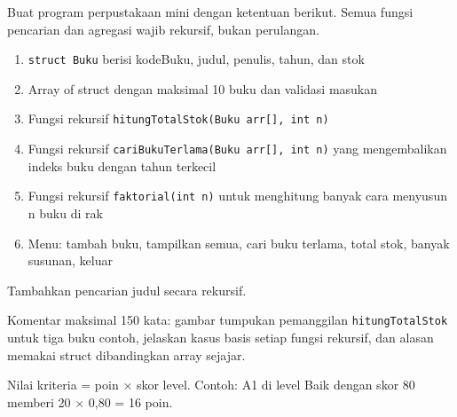 \documentclass[a4paper]{article}
\begin{document}
Buat program perpustakaan mini dengan ketentuan berikut. Semua fungsi pencarian dan agregasi wajib rekursif, bukan perulangan.
\begin{enumerate}
\item \texttt{struct Buku} berisi kodeBuku, judul, penulis, tahun, dan stok
\item Array of struct dengan maksimal 10 buku dan validasi masukan
\item Fungsi rekursif \texttt{hitungTotalStok(Buku arr[], int n)}
\item Fungsi rekursif \texttt{cariBukuTerlama(Buku arr[], int n)} yang mengembalikan indeks buku dengan tahun terkecil
\item Fungsi rekursif \texttt{faktorial(int n)} untuk menghitung banyak cara menyusun n buku di rak
\item Menu: tambah buku, tampilkan semua, cari buku terlama, total stok, banyak susunan, keluar
\end{enumerate}
\begin{Contoh}
Tambahkan pencarian judul secara rekursif.
\end{Contoh}
Komentar maksimal 150 kata: gambar tumpukan pemanggilan \texttt{hitungTotalStok} untuk tiga buku contoh, jelaskan kasus basis setiap fungsi rekursif, dan alasan memakai struct dibandingkan array sejajar.

\par\vspace{4pt}\par\vspace{6pt}
Nilai kriteria = poin × skor level. Contoh: A1 di level Baik dengan skor 80 memberi 20 × 0,80 = 16 poin.
\end{document}
